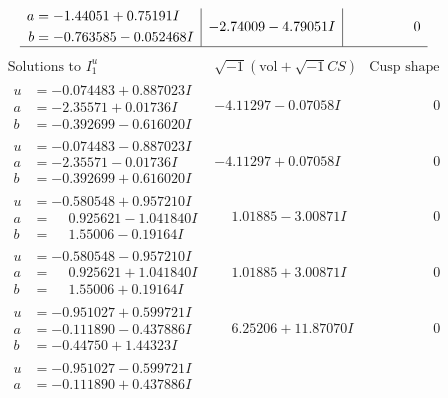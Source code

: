 \documentclass[1p]{elsarticle_modified}
\theoremstyle{definition}
\newcommand{\I}{\sqrt{-1}}
\begin{document}
$$\begin{array}{c|c|c}
\begin{aligned}
a &= -1.44051 + 0.75191 I \\
b &= -0.763585 - 0.052468 I\end{aligned}
 & -2.74009 - 4.79051 I & \phantom{-0.000000 } 0\\
 \hline 
 \end{array}$$\newpage$$\begin{array}{c|c|c}  
\text{Solutions to }I^u_{1}& \I (\text{vol} + \sqrt{-1}CS) & \text{Cusp shape}\\
 \hline 
\begin{aligned}
u &= -0.074483 + 0.887023 I \\
a &= -2.35571 + 0.01736 I \\
b &= -0.392699 - 0.616020 I\end{aligned}
 & -4.11297 - 0.07058 I & \phantom{-0.000000 } 0 \\ \hline\begin{aligned}
u &= -0.074483 - 0.887023 I \\
a &= -2.35571 - 0.01736 I \\
b &= -0.392699 + 0.616020 I\end{aligned}
 & -4.11297 + 0.07058 I & \phantom{-0.000000 } 0 \\ \hline\begin{aligned}
u &= -0.580548 + 0.957210 I \\
a &= \phantom{-}0.925621 - 1.041840 I \\
b &= \phantom{-}1.55006 - 0.19164 I\end{aligned}
 & \phantom{-}1.01885 - 3.00871 I & \phantom{-0.000000 } 0 \\ \hline\begin{aligned}
u &= -0.580548 - 0.957210 I \\
a &= \phantom{-}0.925621 + 1.041840 I \\
b &= \phantom{-}1.55006 + 0.19164 I\end{aligned}
 & \phantom{-}1.01885 + 3.00871 I & \phantom{-0.000000 } 0 \\ \hline\begin{aligned}
u &= -0.951027 + 0.599721 I \\
a &= -0.111890 - 0.437886 I \\
b &= -0.44750 + 1.44323 I\end{aligned}
 & \phantom{-}6.25206 + 11.87070 I & \phantom{-0.000000 } 0 \\ \hline\begin{aligned}
u &= -0.951027 - 0.599721 I \\
a &= -0.111890 + 0.437886 I \\

\end{aligned}
\end{array}$$
\end{document}
